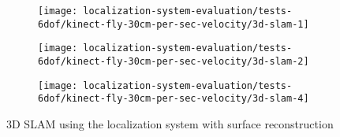 \begin{figure}[H]
	\centering
	\begin{subfigure}[ht]{0.45\textwidth}
		\centering
		\texttt{[image: localization-system-evaluation/tests-6dof/kinect-fly-30cm-per-sec-velocity/3d-slam-1]}
	\end{subfigure}
	\begin{subfigure}[ht]{0.45\textwidth}
		\centering
		\texttt{[image: localization-system-evaluation/tests-6dof/kinect-fly-30cm-per-sec-velocity/3d-slam-2]}
	\end{subfigure}
	\begin{subfigure}[ht]{0.45\textwidth}
		\centering
		\texttt{[image: localization-system-evaluation/tests-6dof/kinect-fly-30cm-per-sec-velocity/3d-slam-4]}
	\end{subfigure}
	\caption{3D SLAM using the localization system with surface reconstruction}
	\label{fig:localization-system-evaluation_kinect-fly-30cm-per-sec-velocity-drl-slam}
\end{figure}
